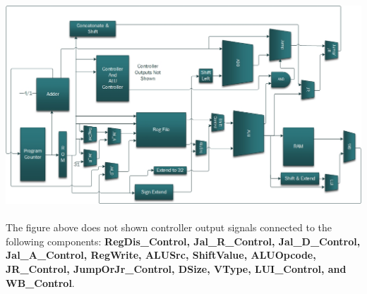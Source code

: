 \documentclass{article}
\begin{document}
	\includegraphics[width=1\columnwidth]{datapath.jpg} \\ \\
	
		The figure above does not shown controller output signals connected to the following components: \textbf{RegDis\_Control, Jal\_R\_Control, Jal\_D\_Control, Jal\_A\_Control, RegWrite, ALUSrc, ShiftValue, ALUOpcode, JR\_Control, JumpOrJr\_Control, DSize, VType, LUI\_Control, and WB\_Control}.
\end{document}
